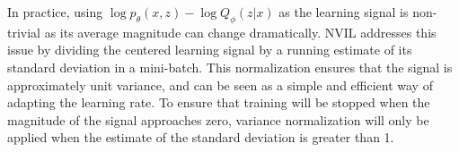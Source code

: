 \documentclass[11pt,a4paper]{article}
\begin{document}
In practice, using $\log p_\theta(x,z) - \log Q_\phi(z|x)$ as the learning signal is non-trivial as its average magnitude can change dramatically. NVIL addresses this issue by dividing the centered learning signal by a running estimate of its standard deviation in a mini-batch. This normalization ensures that the signal is approximately unit variance, and can be seen as a simple and efficient way of adapting the learning rate. To ensure that training will be stopped when the magnitude of the signal approaches zero, variance normalization will only be applied when the estimate of the standard deviation is greater than 1.



\end{document}
